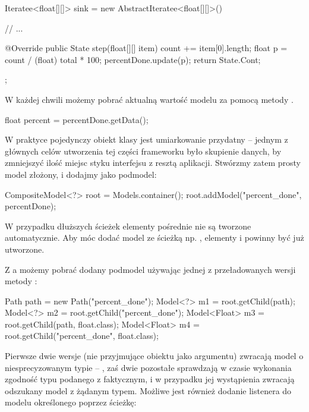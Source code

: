 \begin{java}
Iteratee<float[][]> sink = new AbstractIteratee<float[][]>() {

    // ...

    @Override
    public State step(float[][] item) {
        count += item[0].length;
        float p = count / (float) total * 100;
        percentDone.update(p);
        return State.Cont;
    }
};
\end{java}

W każdej chwili możemy pobrać aktualną wartość modelu za pomocą metody .

\begin{java}
float percent = percentDone.getData();
\end{java}

W praktyce pojedynczy obiekt klasy  jest umiarkowanie przydatny -- jednym z głównych
celów utworzenia tej części frameworku było skupienie danych, by zmniejszyć ilość miejsc styku
interfejsu z resztą aplikacji. Stwórzmy zatem prosty model złożony, i dodajmy 
jako podmodel:

\begin{java}
CompositeModel<?> root = Models.container();
root.addModel("percent_done", percentDone);
\end{java}

\begin{Caution}
W przypadku dłuższych ścieżek elementy pośrednie nie są tworzone automatycznie. Aby móc dodać model
ze ścieżką np. , elementy  i  powinny być już
utworzone.  
\end{Caution}

Z a możemy pobrać dodany podmodel używając jednej z przeładowanych wersji metody
:

\begin{java}
Path path = new Path("percent_done");
Model<?> m1 = root.getChild(path);
Model<?> m2 = root.getChild("percent_done");
Model<Float> m3 = root.getChild(path, float.class);
Model<Float> m4 = root.getChild("percent_done", float.class);
\end{java}

Pierwsze dwie wersje (nie przyjmujące obiektu  jako argumentu) zwracają model o
niesprecyzowanym typie -- , zaś dwie pozostałe sprawdzają w czasie wykonania zgodność typu
podanego z faktycznym, i w przypadku jej wystąpienia zwracają odszukany model z żądanym typem.
Możliwe jest również dodanie listenera do modelu określonego poprzez ścieżkę:


